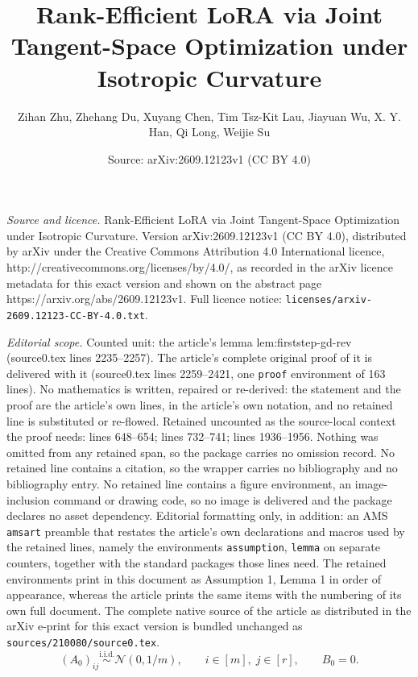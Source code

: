 \documentclass[10pt,a4paper]{amsart}
\title{Rank-Efficient LoRA via Joint Tangent-Space Optimization under Isotropic Curvature}
\author{Zihan Zhu, Zhehang Du, Xuyang Chen, Tim Tsz-Kit Lau, Jiayuan Wu, X. Y. Han, Qi Long, Weijie Su}
\date{Source: arXiv:2609.12123v1 (CC BY 4.0)}
\begin{document}
\maketitle

\noindent\emph{Source and licence.} Rank-Efficient LoRA via Joint Tangent-Space Optimization under Isotropic Curvature. Version arXiv:2609.12123v1 (CC BY 4.0), distributed by arXiv under the Creative Commons Attribution 4.0 International licence, http://creativecommons.org/licenses/by/4.0/, as recorded in the arXiv licence metadata for this exact version and shown on the abstract page https://arxiv.org/abs/2609.12123v1. Full licence notice: \texttt{licenses/arxiv-2609.12123-CC-BY-4.0.txt}.\par\smallskip

\noindent\textit{Editorial scope.} Counted unit: the article's lemma lem:firststep-gd-rev (source0.tex lines 2235--2257). The article's complete original proof of it is delivered with it (source0.tex lines 2259--2421, one \texttt{proof} environment of 163 lines). No mathematics is written, repaired or re-derived: the statement and the proof are the article's own lines, in the article's own notation, and no retained line is substituted or re-flowed.  Retained uncounted as the source-local context the proof needs: lines 648--654; lines 732--741; lines 1936--1956.  Nothing was omitted from any retained span, so the package carries no omission record.  No retained line contains a citation, so the wrapper carries no bibliography and no bibliography entry.  No retained line contains a figure environment, an image-inclusion command or drawing code, so no image is delivered and the package declares no asset dependency.  Editorial formatting only, in addition: an AMS \texttt{amsart} preamble that restates the article's own declarations and macros used by the retained lines, namely the environments \texttt{assumption}, \texttt{lemma} on separate counters, together with the standard packages those lines need.  The retained environments print in this document as Assumption 1, Lemma 1 in order of appearance, whereas the article prints the same items with the numbering of its own full document.  The complete native source of the article as distributed in the arXiv e-print for this exact version is bundled unchanged as \texttt{sources/210080/source0.tex}.
\begin{equation}
\label{eq:init-firststep-rev}
(A_0)_{ij}\overset{\mathrm{i.i.d.}}{\sim}\mathcal N(0,1/m),
\qquad i\in[m],\; j\in[r],
\qquad
B_0=0 .
\end{equation}
\end{document}

